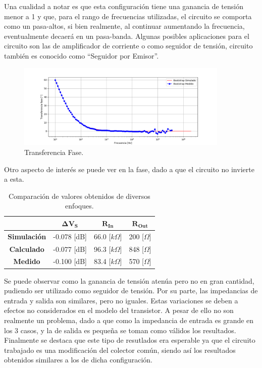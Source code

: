Una cualidad a notar es que esta configuración tiene una ganancia de tensión menor a 1 y que, para el rango de frecuencias utilizadas, el circuito se comporta como un pasa-altos, si bien realmente, al continuar aumentando la frecuencia, eventualmente decaerá en un pasa-banda. Algunas posibles aplicaciones para el circuito son las de amplificador de corriente o como seguidor de tensión, circuito también es conocido como ``Seguidor por Emisor''.
\begin{figure} [H]
	\centering
	\includegraphics[width=0.9\textwidth]{imagenes/avsp.png}
	\caption{Transferencia Fase.}
	\label{fig:transph}
\end{figure}

Otro aspecto de interés se puede ver en la fase, dado a que el circuito no invierte a esta.
\begin{table}[H]
\centering
\begin{tabular}{cccc}
\hline                   & $\mathbf{\Delta V_S}$ & $\mathbf{R_{In}}$ & $\mathbf{R_{Out}}$ \\
\hline
\textbf{Simulación} & -0.078 [dB]          & 66.0 [$k\Omega$]    & 200 [$\Omega$]     \\
\textbf{Calculado}  & -0.077 [dB]            & 96.3 [$k\Omega$]   & 848 [$\Omega$]     \\
\textbf{Medido}     & -0.100 [dB]             & 83.4 [$k\Omega$]  & 570 [$\Omega$]   	\\
\hline
\end{tabular}
\caption{Comparación de valores obtenidos de diversos enfoques.}
\label{tabla:comparacion}
\end{table}

Se puede observar como la ganancia de tensión atenúa pero no en gran cantidad, pudiendo ser utilizado como seguidor de tensión. Por su parte, las impedancias de entrada y salida son similares, pero no iguales. Estas variaciones se deben a efectos no considerados en el modelo del transistor. A pesar de ello no son realmente un problema, dado a que como la impedancia de entrada es grande en los 3 casos, y la de salida es pequeña se toman como válidos los resultados. Finalmente se destaca que este tipo de resutlados era esperable ya que el circuito trabajado es una modificación del colector común, siendo así los resultados obtenidos similares a los de dicha configuración.

